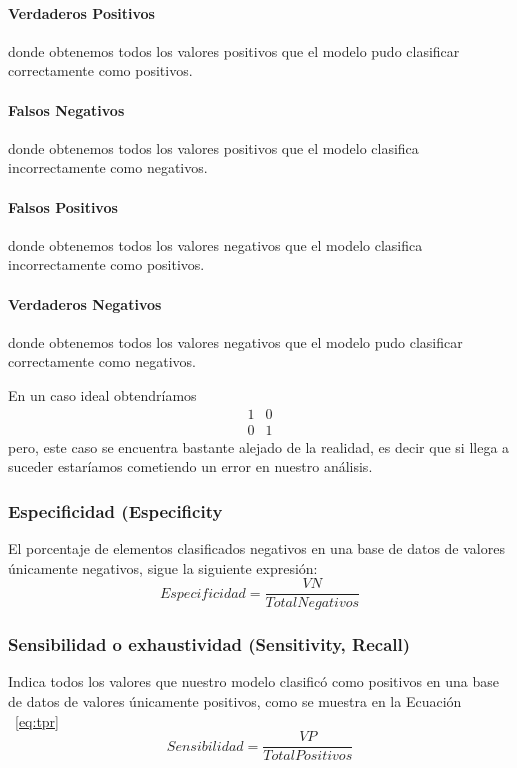 \documentclass[10pt,a4paper]{article}
\begin{document}
\paragraph{Verdaderos Positivos} donde obtenemos todos los valores positivos que el modelo pudo clasificar correctamente como positivos.
\paragraph{Falsos Negativos} donde obtenemos todos los valores positivos que el modelo clasifica incorrectamente como negativos.
\paragraph{Falsos Positivos} donde obtenemos todos los valores negativos que el modelo clasifica incorrectamente como positivos.
\paragraph{Verdaderos Negativos} donde obtenemos todos los valores negativos que el modelo pudo clasificar correctamente como negativos.

En un caso ideal obtendríamos
\begin{equation}
\begin{array}{cc}
1 & 0 \\ 
0 & 1
\end{array}
\end{equation}
pero, este caso se encuentra bastante alejado de la realidad, es decir que si llega a suceder estaríamos cometiendo un error en nuestro análisis.

\subsubsection{Especificidad (Especificity}
El porcentaje de elementos clasificados negativos en una base de datos de valores únicamente negativos, sigue la siguiente expresión:
\begin{equation}
Especificidad = \frac{VN}{Total Negativos}
\end{equation}


\subsubsection{Sensibilidad o exhaustividad (Sensitivity, Recall)}
Indica todos los valores que nuestro modelo clasificó como positivos en una base de datos de valores únicamente positivos, como se muestra en la Ecuación ~\ref{eq:tpr}
\begin{equation}
Sensibilidad = \frac{VP}{Total Positivos}
\label{eq:tpr}
\end{equation}
\end{document}
